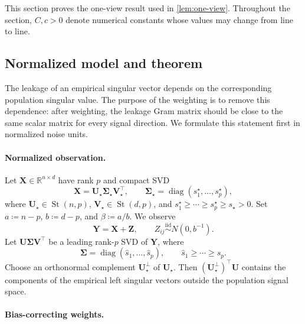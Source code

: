 \documentclass[11pt]{article}
\newcommand{\R}{\mathbb{R}}
\newcommand{\trans}{\top}
\DeclareMathOperator{\diag}{diag}
\DeclareMathOperator{\St}{St}
\begin{document}
This section proves the one-view result used in
\cref{lem:one-view}.  Throughout the section, $C,c>0$ denote numerical
constants whose values may change from line to line.



\subsection{Normalized model and theorem}
\label{app:one-view-statement}

The leakage of an empirical singular vector depends on the corresponding
population singular value.  The purpose of the weighting is to remove this
dependence: after weighting, the leakage Gram matrix should be close to the
same scalar matrix for every signal direction.  We formulate this statement
first in normalized noise units.

\paragraph{Normalized observation.}

Let $\bm X\in\R^{n\times d}$ have rank $p$ and compact SVD
\[
  \bm X
  =
  \bm U_\star\bm\Sigma_\star\bm V_\star^\trans,
  \qquad
  \bm\Sigma_\star
  =
  \diag(s_1^\star,\ldots,s_p^\star),
\]
where $\bm U_\star\in\St(n,p)$, $\bm V_\star\in\St(d,p)$, and
$s_1^\star\ge\cdots\ge s_p^\star\ge s_\star>0$.  Set
$a\coloneqq n-p$, $b\coloneqq d-p$, and $\beta\coloneqq a/b$.  We observe
\begin{equation}
\label{eq:one-view-model}
  \bm Y=\bm X+\bm Z,
  \qquad
  Z_{ij}\stackrel{\mathrm{iid}}{\sim}N(0,b^{-1}).
\end{equation}
Let $\bm U\bm\Sigma\bm V^\trans$ be a leading rank-$p$ SVD of $\bm Y$,
where
\[
  \bm\Sigma
  =
  \diag(\widehat s_1,\ldots,\widehat s_p),
  \qquad
  \widehat s_1\ge\cdots\ge\widehat s_p.
\]
Choose an orthonormal complement $\bm U_\star^\perp$ of $\bm U_\star$.
Then $(\bm U_\star^\perp)^\trans\bm U$ contains the components of the
empirical left singular vectors outside the population signal space.

\paragraph{Bias-correcting weights.}
\end{document}
